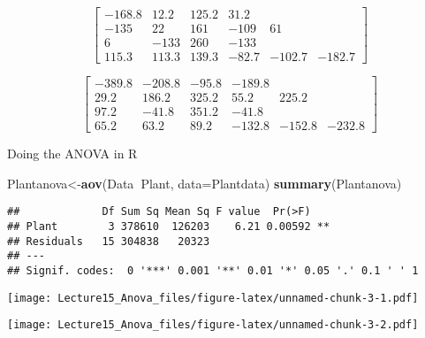 \documentclass[]{article}
\newenvironment{Shaded}{\begin{snugshade}}{\end{snugshade}}
\newcommand{\KeywordTok}[1]{\textcolor[rgb]{0.13,0.29,0.53}{\textbf{#1}}}
\newcommand{\DataTypeTok}[1]{\textcolor[rgb]{0.13,0.29,0.53}{#1}}
\newcommand{\OperatorTok}[1]{\textcolor[rgb]{0.81,0.36,0.00}{\textbf{#1}}}
\newcommand{\NormalTok}[1]{#1}
\begin{document}
\[\left[\begin{array}
{rrrrrr}
-168.8 & 12.2  & 125.2  & 31.2  \\
-135 & 22 & 161 & -109 & 61 \\
6 & -133 & 260 & -133 \\
115.3 & 113.3 & 139.3& -82.7 & -102.7 & -182.7
\end{array}\right]
\]

\[\left[\begin{array}
{rrrrrr}
-389.8 & -208.8  & -95.8  & -189.8  \\
29.2 & 186.2 & 325.2 & 55.2 & 225.2 \\
97.2 & -41.8 & 351.2 & -41.8 \\
65.2 & 63.2 & 89.2 & -132.8 & -152.8 & -232.8
\end{array}\right]
\]

Doing the ANOVA in R

\begin{Shaded}
\begin{Highlighting}[]
\NormalTok{Plantanova<-}\KeywordTok{aov}\NormalTok{(Data}\OperatorTok{~}\NormalTok{Plant, }\DataTypeTok{data=}\NormalTok{Plantdata)}
\KeywordTok{summary}\NormalTok{(Plantanova)}
\end{Highlighting}
\end{Shaded}

\begin{verbatim}
##             Df Sum Sq Mean Sq F value  Pr(>F)   
## Plant        3 378610  126203    6.21 0.00592 **
## Residuals   15 304838   20323                   
## ---
## Signif. codes:  0 '***' 0.001 '**' 0.01 '*' 0.05 '.' 0.1 ' ' 1
\end{verbatim}

\begin{Shaded}
\end{Shaded}

\texttt{[image: Lecture15\_Anova\_files/figure-latex/unnamed-chunk-3-1.pdf]}

\begin{Shaded}
\end{Shaded}

\texttt{[image: Lecture15\_Anova\_files/figure-latex/unnamed-chunk-3-2.pdf]}
\end{document}
